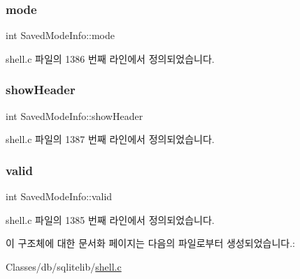 \subsubsection{\texorpdfstring{mode}{mode}}
{\footnotesize\ttfamily int Saved\+Mode\+Info\+::mode}



shell.\+c 파일의 1386 번째 라인에서 정의되었습니다.

\mbox{\label{struct_saved_mode_info_a73fa5b451f94fa75fb5e27887831b8f4}} 
\subsubsection{\texorpdfstring{show\+Header}{showHeader}}
{\footnotesize\ttfamily int Saved\+Mode\+Info\+::show\+Header}



shell.\+c 파일의 1387 번째 라인에서 정의되었습니다.

\mbox{\label{struct_saved_mode_info_a43e863fb285c2aad913087572ebd5e27}} 
\subsubsection{\texorpdfstring{valid}{valid}}
{\footnotesize\ttfamily int Saved\+Mode\+Info\+::valid}



shell.\+c 파일의 1385 번째 라인에서 정의되었습니다.



이 구조체에 대한 문서화 페이지는 다음의 파일로부터 생성되었습니다.\+:\begin{DoxyCompactItemize}
\item 
Classes/db/sqlitelib/\hyperlink{shell_8c}{shell.\+c}\end{DoxyCompactItemize}
